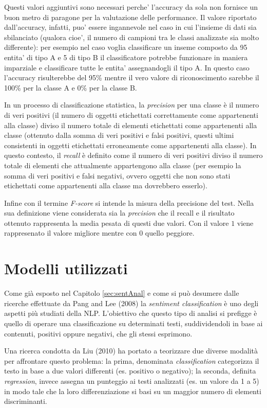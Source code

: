\documentclass[a4paper,12pt,openright,twoside]{report}
\theoremstyle{definition}
\begin{document}
Questi valori aggiuntivi sono necessari perche' l'accuracy da sola non fornisce un buon metro di paragone
per la valutazione delle performance. Il valore riportato dall'accuracy, infatti, puo' essere ingannevole
nel caso in cui l'insieme di dati sia sbilanciato (qualora cioe', il numero di campioni tra le classi analizzate
sia molto differente): per esempio nel caso voglia classificare un inseme composto da 95 entita' di tipo A
e 5 di tipo B il classificatore potrebbe funzionare in maniera imparziale e classificare tutte le entita' 
assegnandogli il tipo A. In questo caso l'accuracy risulterebbe del 95\% mentre il vero valore di riconoscimento
 sarebbe il 100\% per la classe A e 0\% per la classe B.

In un processo di classificazione statistica, la \emph{precision} per una classe è il numero di 
veri positivi (il numero di oggetti etichettati correttamente come appartenenti alla classe) 
diviso il numero totale di elementi etichettati come appartenenti alla classe 
(ottenuto dalla somma di veri positivi e falsi positivi, 
questi ultimi consistenti in oggetti etichettati erroneamente 
come appartenenti alla classe). In questo contesto, il \emph{recall} è definito come il numero 
di veri positivi diviso il numero totale di elementi che attualmente appartengono alla classe 
(per esempio la somma di veri positivi e falsi negativi, ovvero oggetti che non 
sono stati etichettati come appartenenti alla classe ma dovrebbero esserlo).

Infine con il termine \emph{F-score} si intende la misura della precisione del test. Nella sua
definizione viene considerata sia la \emph{precision} che il recall e il risultato ottenuto rappresenta
la media pesata di questi due valori. Con il valore $1$ viene rappresenato il valore migliore
mentre con 0 quello peggiore.

\section{Modelli utilizzati}
Come già esposto nel Capitolo \ref{sec:sentAnal} e come si può desumere
dalle ricerche effettuate da Pang and Lee (2008) %
la \emph{sentiment classification} è uno degli aspetti più studiati della NLP.
L’obiettivo che questo tipo di analisi si prefigge è quello di operare una classificazione su determinati testi, 
suddividendoli in base ai contenuti, positivi oppure negativi, che gli stessi esprimono. 

Una ricerca condotta da 
Liu (2010) %
ha portato a teorizzare due diverse modalità per affrontare questo problema: la prima, denominata
 \emph{classification}
categorizza il testo in base a due valori differenti (es. positivo o negativo); la seconda, definita 
\emph{regression}, invece assegna un punteggio ai testi analizzati (es. un valore da 1 a 5)
in modo tale che la loro differenziazione si basi su un maggior numero di elementi discriminanti.
\end{document}
